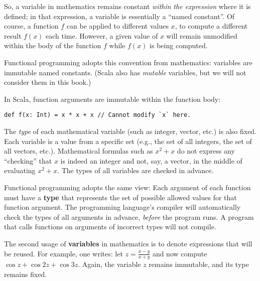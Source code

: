 So, a variable in mathematics remains constant \emph{within} \emph{the
expression} where it is defined; in that expression, a variable is
essentially a \textsf{``}named constant\textsf{''}. Of course, a function $f$ can
be applied to different values $x$, to compute a different result
$f(x)$ each time. However, a given value of $x$ will remain unmodified
within the body of the function $f$ while $f(x)$ is being computed.

Functional programming adopts this convention from mathematics: variables
are immutable named constants. (Scala also has \emph{mutable} variables,
but we will not consider them in this book.)

In Scala, function arguments are immutable within the function body:
\begin{lstlisting}
def f(x: Int) = x * x + x // Cannot modify `x` here.
\end{lstlisting}

The \emph{type} of each mathematical variable (such as integer, vector,
etc.) is also fixed. Each variable is a value from a specific set
(e.g., the set of all integers, the set of all vectors, etc.). Mathematical
formulas such as $x^{2}+x$ do not express any \textsf{``}checking\textsf{''} that
$x$ is indeed an integer and not, say, a vector, in the middle of
evaluating $x^{2}+x$. The types of all variables are checked in advance.

Functional programming adopts the same view: Each argument of each
function must have a \textbf{type} that represents the
set of possible allowed values for that function argument. The programming
language\textsf{'}s compiler will automatically check the types of all arguments
in advance, \emph{before} the program runs. A program that calls functions
on arguments of incorrect types will not compile.

The second usage of \textbf{variables} in mathematics
is to denote expressions that will be reused. For example, one writes:
let $z=\frac{x-y}{x+y}$ and now compute $\cos z+\cos2z+\cos3z$.
Again, the variable $z$ remains immutable, and its type remains fixed.

